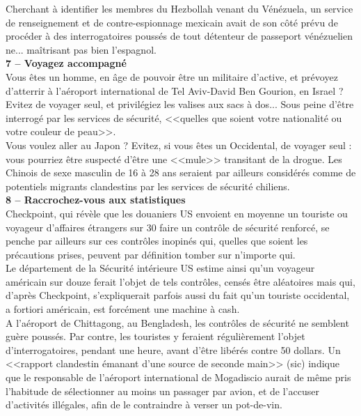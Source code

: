 \documentclass[11pt,twoside,a4paper]{article}
\begin{document}
Cherchant {\`a} identifier les membres du Hezbollah venant du V{\'e}n{\'e}zuela, un service de renseignement et de contre-espionnage mexicain avait de son c{\^o}t{\'e} pr{\'e}vu de proc{\'e}der {\`a} des interrogatoires pouss{\'e}s de tout d{\'e}tenteur de passeport v{\'e}n{\'e}zuelien ne... ma{\^i}trisant pas bien l'espagnol. ~\\

\textbf{\large 7 -- Voyagez accompagn{\'e}}~\\

Vous {\^e}tes un homme, en {\^a}ge de pouvoir {\^e}tre un militaire d'active, et pr{\'e}voyez d'atterrir {\`a} l'a{\'e}roport international de Tel Aviv-David Ben Gourion, en Israel ? Evitez de voyager seul, et privil{\'e}giez les valises aux sacs {\`a} dos... Sous peine d'{\^e}tre interrog{\'e} par les services de s{\'e}curit{\'e}, <<quelles que soient votre nationalit{\'e} ou votre couleur de peau>>. ~\\

Vous voulez aller au Japon ? Evitez, si vous {\^e}tes un Occidental, de voyager seul : vous pourriez {\^e}tre suspect{\'e} d'{\^e}tre une <<mule>> transitant de la drogue. Les Chinois de sexe masculin de 16 {\`a} 28 ans seraient par ailleurs consid{\'e}r{\'e}s comme de potentiels migrants clandestins par les services de s{\'e}curit{\'e} chiliens. ~\\

\textbf{\large 8 -- Raccrochez-vous aux statistiques}~\\

Checkpoint, qui r{\'e}v{\`e}le que les douaniers US envoient en moyenne un touriste ou voyageur d'affaires {\'e}trangers sur 30 faire un contr{\^o}le de s{\'e}curit{\'e} renforc{\'e}, se penche par ailleurs sur ces contr{\^o}les inopin{\'e}s qui, quelles que soient les pr{\'e}cautions prises, peuvent par d{\'e}finition tomber sur n'importe qui. ~\\

Le d{\'e}partement de la S{\'e}curit{\'e} int{\'e}rieure US estime ainsi qu'un voyageur am{\'e}ricain sur douze ferait l'objet de tels contr{\^o}les, cens{\'e}s {\^e}tre al{\'e}atoires mais qui, d'apr{\`e}s Checkpoint, s'expliquerait parfois aussi du fait qu'un touriste occidental, a fortiori am{\'e}ricain, est forc{\'e}ment une machine {\`a} cash. ~\\

A l'a{\'e}roport de Chittagong, au Bengladesh, les contr{\^o}les de s{\'e}curit{\'e} ne semblent gu{\`e}re pouss{\'e}s. Par contre, les touristes y feraient r{\'e}guli{\`e}rement l'objet d'interrogatoires, pendant une heure, avant d'{\^e}tre lib{\'e}r{\'e}s contre 50 dollars. Un <<rapport clandestin {\'e}manant d'une source de seconde main>> (sic) indique que le responsable de l'a{\'e}roport international de Mogadiscio aurait de m{\^e}me pris l'habitude de s{\'e}lectionner au moins un passager par avion, et de l'accuser d'activit{\'e}s ill{\'e}gales, afin de le contraindre {\`a} verser un pot-de-vin. ~\\
\end{document}
